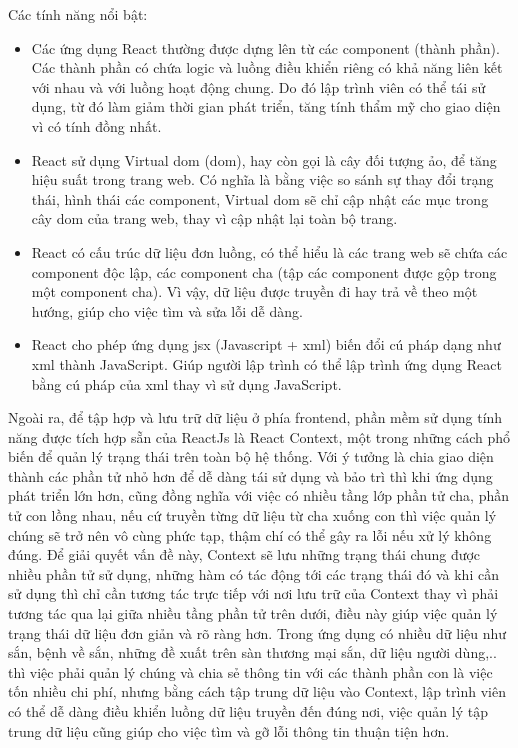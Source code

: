 \documentclass[./../main.tex]{subfiles}
\begin{document}
Các tính năng nổi bật:
\begin{itemize}
    \item Các ứng dụng React thường được dựng lên từ các component (thành phần). Các thành phần có chứa logic và luồng điều khiển riêng có khả năng liên kết với nhau và với luồng hoạt động chung. Do đó lập trình viên có thể tái sử dụng, từ đó làm giảm thời gian phát triển, tăng tính thẩm mỹ cho giao diện vì có tính đồng nhất.
    \item React sử dụng Virtual \acrshort{dom} (\acrlong{dom}), hay còn gọi là cây đối tượng ảo, để tăng hiệu suất trong trang web. Có nghĩa là bằng việc so sánh sự thay đổi trạng thái, hình thái các component, Virtual \acrshort{dom} sẽ chỉ cập nhật các mục trong cây \acrshort{dom} của trang web, thay vì cập nhật lại toàn bộ trang.
    \item React có cấu trúc dữ liệu đơn luồng, có thể hiểu là các trang web sẽ chứa các component độc lập, các component cha (tập các component được gộp trong một component cha). Vì vậy, dữ liệu được truyền đi hay trả về theo một hướng, giúp cho việc tìm và sửa lỗi dễ dàng.
    \item React cho phép ứng dụng \acrshort{jsx} (Javascript + \acrshort{xml}) biến đổi cú pháp dạng như \acrshort{xml} thành JavaScript. Giúp người lập trình có thể lập trình ứng dụng React bằng cú pháp của \acrshort{xml} thay vì sử dụng JavaScript.
\end{itemize}

Ngoài ra, để tập hợp và lưu trữ dữ liệu ở phía frontend, phần mềm sử dụng tính năng được tích hợp sẵn của ReactJs là React Context, một trong những cách phổ biến để quản lý trạng thái trên toàn bộ hệ thống. Với ý tưởng là chia giao diện thành các phần tử nhỏ hơn để dễ dàng tái sử dụng và bảo trì thì khi ứng dụng phát triển lớn hơn, cũng đồng nghĩa với việc có nhiều tầng lớp phần tử cha, phần tử con lồng nhau, nếu cứ truyền từng dữ liệu từ cha xuống con thì việc quản lý chúng sẽ trở nên vô cùng phức tạp, thậm chí có thể gây ra lỗi nếu xử lý không đúng. Để giải quyết vấn đề này, Context sẽ lưu những trạng thái chung được nhiều phần tử sử dụng, những hàm có tác động tới các trạng thái đó và khi cần sử dụng thì chỉ cần tương tác trực tiếp với nơi lưu trữ của Context thay vì phải tương tác qua lại giữa nhiều tầng phần tử trên dưới, điều này giúp việc quản lý trạng thái dữ liệu đơn giản và rõ ràng hơn. Trong ứng dụng có nhiều dữ liệu như sắn, bệnh về sắn, những đề xuất trên sàn thương mại sắn, dữ liệu người dùng,.. thì việc phải quản lý chúng và chia sẻ thông tin với các thành phần con là việc tốn nhiều chi phí, nhưng bằng cách tập trung dữ liệu vào Context, lập trình viên có thể dễ dàng điều khiển luồng dữ liệu truyền đến đúng nơi, việc quản lý tập trung dữ liệu cũng giúp cho việc tìm và gỡ lỗi thông tin thuận tiện hơn.
\end{document}
